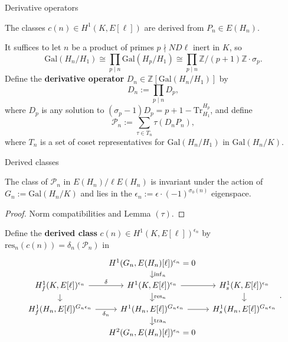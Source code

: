 \documentclass[10pt]{beamer}
\begin{document}
\begin{frame}[t]{Derivative operators}

The classes $ c(n) \in H^1(K, E[\ell]) $ are derived from $ P_n \in E(H_n) $.

\vspace{0.5cm} It suffices to let $ n $ be a product of primes $ p \nmid ND\ell $ inert in $ K $, so
$$ \mathrm{Gal}(H_n / H_1) \cong \prod_{p \mid n} \mathrm{Gal}(H_p / H_1) \cong \prod_{p \mid n} \mathbb{Z} / (p + 1)\mathbb{Z} \cdot \sigma_p. $$
Define the \textbf{derivative operator} $ D_n \in \mathbb{Z}[\mathrm{Gal}(H_n / H_1)] $ by
$$ D_n := \prod_{p \mid n} D_p, $$
where $ D_p $ is any solution to $ (\sigma_p - 1)D_p = p + 1 - \mathrm{Tr}_{H_1}^{H_p} $, and define
$$ \mathcal{P}_n := \sum_{\tau \in T_n} \tau(D_nP_n), $$
where $ T_n $ is a set of coset representatives for $ \mathrm{Gal}(H_n / H_1) $ in $ \mathrm{Gal}(H_n / K) $.

\end{frame}

\begin{frame}[t]{Derived classes}

\begin{lemma}
The class of $ \mathcal{P}_n $ in $ E(H_n) / \ell E(H_n) $ is invariant under the action of $ G_n := \mathrm{Gal}(H_n / K) $ and lies in the $ \epsilon_n := \epsilon \cdot (-1)^{\sigma_0(n)} $ eigenspace.
\end{lemma}

\begin{proof}
Norm compatibilities and Lemma $ (\tau) $.
\end{proof}

\vspace{0.5cm} Define the \textbf{derived class} $ c(n) \in H^1(K, E[\ell])^{\epsilon_n} $ by $ \mathrm{res}_n(c(n)) = \delta_n(\mathcal{P}_n) $ in
$$
\begin{tikzcd}[ampersand replacement=\&, column sep=small, row sep=small]
\& H^1(G_n, E(H_n)[\ell])^{\epsilon_n} = 0 \arrow{d}{\mathrm{inf}_n} \& \\
H_f^1(K, E[\ell])^{\epsilon_n} \arrow{r}{\delta} \arrow{d} \& H^1(K, E[\ell])^{\epsilon_n} \arrow{r} \arrow{d}{\mathrm{res}_n} \& H_s^1(K, E[\ell])^{\epsilon_n} \arrow{d} \\
H_f^1(H_n, E[\ell])^{G_n\epsilon_n} \arrow{r}[swap]{\delta_n} \& H^1(H_n, E[\ell])^{G_n\epsilon_n} \arrow{r} \arrow{d}{\mathrm{tra}_n} \& H_s^1(H_n, E[\ell])^{G_n\epsilon_n} \\
\& H^2(G_n, E(H_n)[\ell])^{\epsilon_n} = 0 \&
\end{tikzcd}.
$$

\end{frame}
\end{document}
